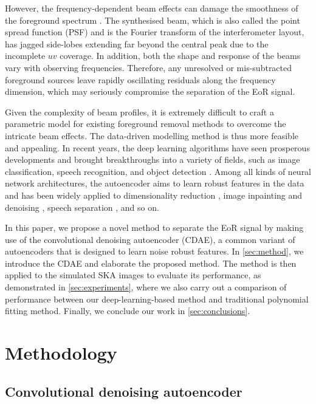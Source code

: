 \documentclass[letters,a4paper,fleqn,usenatbib]{mnras}
\begin{document}
However, the frequency-dependent beam effects can damage the smoothness
of the foreground spectrum \citep{liu2009ps}.
The synthesised beam, which is also called the point spread function (PSF)
and is the Fourier transform of the interferometer layout, has jagged
side-lobes extending far beyond the central peak due to the incomplete
$uv$ coverage.
In addition, both the shape and response of the beams vary with
observing frequencies.
Therefore, any unresolved or mis-subtracted foreground sources leave
rapidly oscillating residuals along the frequency dimension, which may
seriously compromise the separation of the EoR signal.

Given the complexity of beam profiles, it is extremely difficult to
craft a parametric model for existing foreground removal methods to
overcome the intricate beam effects.
The data-driven modelling method is thus more feasible and appealing.
In recent years, the deep learning algorithms have seen prosperous
developments and brought breakthroughs into a variety of fields, such
as image classification, speech recognition, and object detection
\citep{lecun2015}.
Among all kinds of neural network architectures, the autoencoder
aims to learn robust features in the data \citep{vincent2008}
and has been widely applied to
dimensionality reduction \citep{hinton2006},
image inpainting and denoising \citep{suganuma2018},
speech separation \citep{grais2017}, and so on.

In this paper, we propose a novel method to separate the EoR signal by
making use of the convolutional denoising autoencoder (CDAE), a common
variant of autoencoders that is designed to learn noise robust features.
In \autoref{sec:method}, we introduce the CDAE and elaborate the
proposed method.
The method is then applied to the simulated SKA images to evaluate its
performance, as demonstrated in \autoref{sec:experiments},
where we also carry out a comparison of performance between our
deep-learning-based method and traditional polynomial fitting method.
Finally, we conclude our work in \autoref{sec:conclusions}.


\section{Methodology}
\label{sec:method}

\subsection{Convolutional denoising autoencoder}
\label{sec:cdae}
\end{document}
